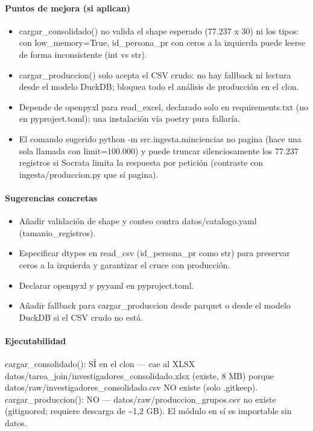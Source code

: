\paragraph{Puntos de mejora (si aplican)}
\begin{itemize}
  \item cargar\_consolidado() no valida el shape esperado (77.237 x 30) ni los tipos: con low\_memory=True, id\_persona\_pr con ceros a la izquierda puede leerse de forma inconsistente (int vs str).
  \item cargar\_produccion() solo acepta el CSV crudo: no hay fallback ni lectura desde el modelo DuckDB; bloquea todo el análisis de producción en el clon.
  \item Depende de openpyxl para read\_excel, declarado solo en requirements.txt (no en pyproject.toml): una instalación vía poetry pura fallaría.
  \item El comando sugerido python -m src.ingesta.minciencias no pagina (hace una sola llamada con limit=100.000) y puede truncar silenciosamente los 77.237 registros si Socrata limita la respuesta por petición (contraste con ingesta/produccion.py que sí pagina).
\end{itemize}

\paragraph{Sugerencias concretas}
\begin{itemize}
  \item Añadir validación de shape y conteo contra datos/catalogo.yaml (tamanio\_registros).
  \item Especificar dtypes en read\_csv (id\_persona\_pr como str) para preservar ceros a la izquierda y garantizar el cruce con producción.
  \item Declarar openpyxl y pyyaml en pyproject.toml.
  \item Añadir fallback para cargar\_produccion desde parquet o desde el modelo DuckDB si el CSV crudo no está.
\end{itemize}

\paragraph{Ejecutabilidad}
cargar\_consolidado(): SÍ en el clon --- cae al XLSX datos/tarea\_join/investigadores\_consolidado.xlsx (existe, 8 MB) porque datos/raw/investigadores\_consolidado.csv NO existe (solo .gitkeep). cargar\_produccion(): NO --- datos/raw/produccion\_grupos.csv no existe (gitignored; requiere descarga de \textasciitilde{}1,2 GB). El módulo en sí es importable sin datos.

